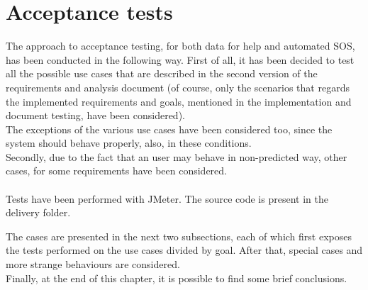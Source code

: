 \section{Acceptance tests}
The approach to acceptance testing, for both data for help and automated SOS, has been
conducted in the following way. 
First of all, it has been decided to test all the possible use cases that are described in the
second version of the requirements and analysis document (of course, only the scenarios that
regards the implemented requirements and goals, mentioned in the implementation and document testing, have been considered). \\
The exceptions of the various use cases have been considered too, since the system should
behave properly, also, in these conditions. \\
Secondly, due to the fact that an user may behave in non-predicted way, other cases, for some
requirements have been considered. \\

\\
Tests have been performed with JMeter. The source code is present in the delivery folder.

\par
The cases are presented in the next two subsections, each of which first exposes the
tests performed on the use cases divided by goal. After that, special cases and more strange
behaviours are considered. \\
Finally, at the end of this chapter, it is possible to find some brief conclusions. 




